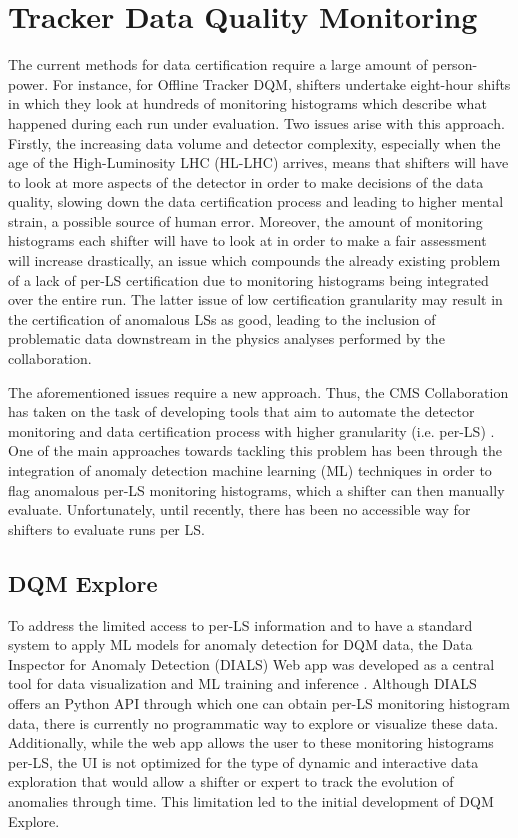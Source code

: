 \chapter{Tracker Data Quality Monitoring}
\label{chap:trackdqm}

The current methods for data certification require a large amount of person-power. For instance, for Offline Tracker DQM, shifters undertake eight-hour shifts in which they look at hundreds of monitoring histograms which describe what happened during each run under evaluation. Two issues arise with this approach. Firstly, the increasing data volume and detector complexity, especially when the age of the High-Luminosity LHC (HL-LHC) arrives, means that shifters will have to look at more aspects of the detector in order to make decisions of the data quality, slowing down the data certification process and leading to higher mental strain, a possible source of human error. Moreover, the amount of monitoring histograms each shifter will have to look at in order to make a fair assessment will increase drastically, an issue which compounds the already existing problem of a lack of per-LS certification due to monitoring histograms being integrated over the entire run. The latter issue of low certification granularity may result in the certification of anomalous LSs as good, leading to the inclusion of problematic data downstream in the physics analyses performed by the collaboration.

The aforementioned issues require a new approach. Thus, the CMS Collaboration has taken on the task of developing tools that aim to automate the detector monitoring and data certification process with higher granularity (i.e. per-LS) \cite{wachirapusitanMachineLearningApplications2023, brinkerhoffAnomalyDetectionAutomated2025, CMS-DP-2021-034}. One of the main approaches towards tackling this problem has been through the integration of anomaly detection machine learning (ML) techniques in order to flag anomalous per-LS monitoring histograms, which a shifter can then manually evaluate. Unfortunately, until recently, there has been no accessible way for shifters to evaluate runs per LS.

\section{DQM Explore}

To address the limited access to per-LS information and to have a standard system to apply ML models for anomaly detection for DQM data, the Data Inspector for Anomaly Detection (DIALS) Web app was developed as a central tool for data visualization and ML training and inference \cite{CmsdqmdcServicesDialsservice2025}. Although DIALS offers an Python API through which one can obtain per-LS monitoring histogram data, there is currently no programmatic way to explore or visualize these data. Additionally, while the web app allows the user to these monitoring histograms per-LS, the UI is not optimized for the type of dynamic and interactive data exploration that would allow a shifter or expert to track the evolution of anomalies through time. This limitation led to the initial development of DQM Explore.

